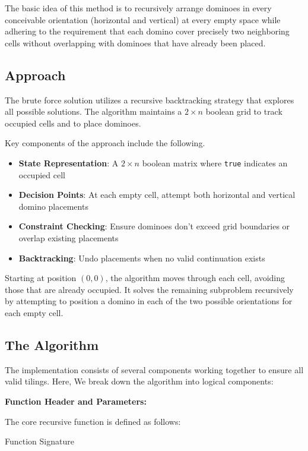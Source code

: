 \documentclass[conference]{IEEEtran}
\begin{document}
The basic idea of this method is to recursively arrange dominoes in every conceivable orientation (horizontal and vertical) at every empty space while adhering to the requirement that each domino cover precisely two neighboring cells without overlapping with dominoes that have already been placed.

\subsection{Approach}

The brute force solution utilizes a recursive backtracking strategy that explores all possible solutions. The algorithm maintains a $2 \times n$ boolean grid to track occupied cells and to place dominoes.

Key components of the approach include the following.

\begin{itemize}
    \item \textbf{State Representation}: A $2 \times n$ boolean matrix where \texttt{true} indicates an occupied cell
    \item \textbf{Decision Points}: At each empty cell, attempt both horizontal and vertical domino placements
    \item \textbf{Constraint Checking}: Ensure dominoes don't exceed grid boundaries or overlap existing placements
    \item \textbf{Backtracking}: Undo placements when no valid continuation exists
\end{itemize}

Starting at position $(0,0)$, the algorithm moves through each cell, avoiding those that are already occupied. It solves the remaining subproblem recursively by attempting to position a domino in each of the two possible orientations for each empty cell.

\subsection{The Algorithm}

The implementation consists of several components working together to ensure all valid tilings. Here, We break down the algorithm into logical components:

\textbf{Function Header and Parameters:}

The core recursive function is defined as follows:

\begin{algorithm}[htbp]
\caption{Function Signature}
\begin{algorithmic}[1]
\EndProcedure
\end{algorithmic}
\end{algorithm}
\end{document}
